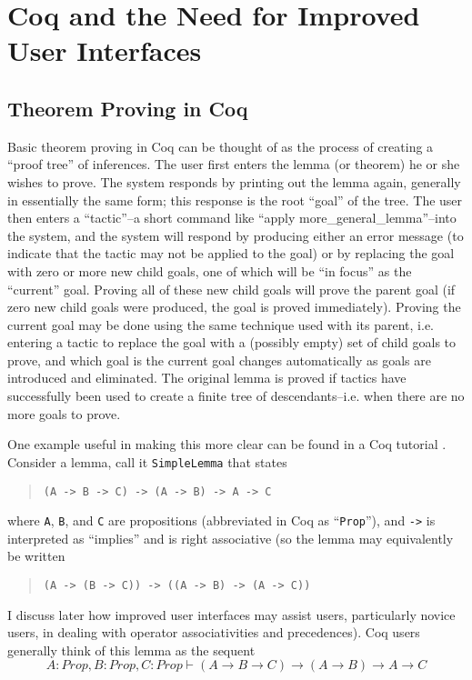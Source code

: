 \documentclass[11pt]{amsart}
\newcommand{\ra}{\ensuremath{\rightarrow}}
\begin{document}
\section{Coq and the Need for Improved User Interfaces}

\subsection{Theorem Proving in Coq}

Basic theorem proving in Coq can be thought of as the process of creating a ``proof tree'' of inferences.  The user first enters the lemma (or theorem) he or she wishes to prove.  The system responds by printing out the lemma again, generally in essentially the same form; this response is the root ``goal'' of the tree.  The user then enters a ``tactic''--a short command like ``apply more\_general\_lemma''--into the system, and the system will respond by producing either an error message (to indicate that the tactic may not be applied to the goal) or by replacing the goal with zero or more new child goals, one of which will be ``in focus'' as the ``current'' goal.  Proving all of these new child goals will prove the parent goal (if zero new child goals were produced, the goal is proved immediately).  Proving the current goal may be done using the same technique used with its parent, i.e. entering a tactic to replace the goal with a (possibly empty) set of child goals to prove, and which goal is the current goal changes automatically as goals are introduced and eliminated.  The original lemma is proved if tactics have successfully been used to create a finite tree of descendants--i.e. when there are no more goals to prove.

One example useful in making this more clear can be found in a Coq tutorial \cite{huet1997coq}.  Consider a lemma, call it \texttt{SimpleLemma} that states
\begin{quote}
\texttt{(A -> B -> C) -> (A -> B) -> A -> C}
\end{quote}
where \texttt{A}, \texttt{B}, and \texttt{C} are propositions (abbreviated in Coq as ``\texttt{Prop}''), and \texttt{->} is interpreted as ``implies'' and is right associative (so the lemma may equivalently be written 
\begin{quote}
\texttt{(A -> (B -> C)) -> ((A -> B) -> (A -> C))}
\end{quote}
I discuss later how improved user interfaces may assist users, particularly novice users, in dealing with operator associativities and precedences).  Coq users generally think of this lemma as the sequent
\[A : Prop, B : Prop, C : Prop \vdash (A \ra B \ra C) \ra (A \ra B) \ra A \ra C\]
\end{document}
